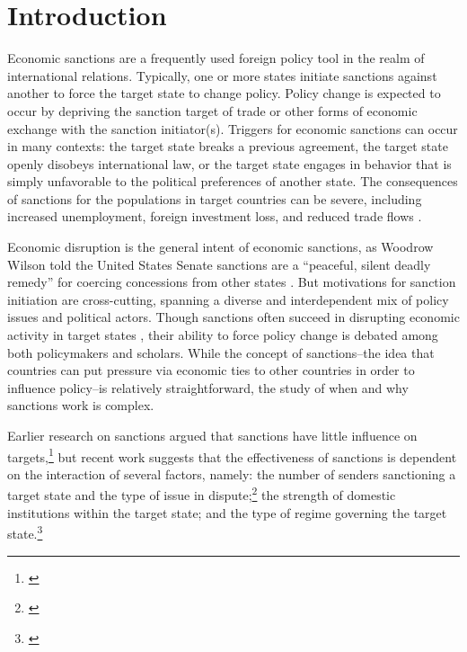 \section*{Introduction}
\label{intro}

Economic sanctions are a frequently used foreign policy tool in the realm of international relations. Typically, one or more states initiate sanctions against another to force the target state to change policy. Policy change is expected to occur by depriving the sanction target of trade or other forms of economic exchange with the sanction initiator(s). Triggers for economic sanctions can occur in many contexts: the target state breaks a previous agreement, the target state openly disobeys international law, or the target state engages in behavior that is simply unfavorable to the political preferences of another state. The consequences of sanctions for the populations in target countries can be severe, including increased unemployment, foreign investment loss, and reduced trade flows \citep{hufbauer2003impact,hufbauer1997us}. 

Economic disruption is the general intent of economic sanctions, as Woodrow Wilson told the United States Senate sanctions are a ``peaceful, silent deadly remedy'' for coercing concessions from other states \citep{foley23}. But motivations for sanction initiation are cross-cutting, spanning a diverse and interdependent mix of policy issues and political actors. Though sanctions often succeed in disrupting economic activity in target states \citep{escriba2010dealing}, their ability to force policy change is debated among both policymakers and scholars.  While the concept of sanctions--the idea that countries can put pressure via economic ties to other countries in order to influence policy--is relatively straightforward, the study of when and why sanctions work is complex.

Earlier research on sanctions argued that sanctions have little influence on targets,\footnote{\cite{lam1990, dashti1997, morgan1997, drezner1998}} but recent work suggests that the effectiveness of sanctions is dependent on the interaction of several factors, namely: the number of senders sanctioning a target state and the type of issue in dispute;\footnote{\cite{miers2002, morgan2009threat}} the strength of domestic institutions within the target state; and the type of regime governing the target state.\footnote{\cite{mcgillivray2004}} 

